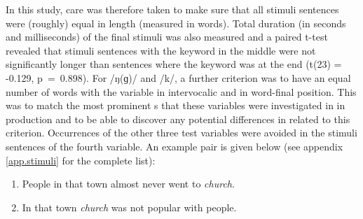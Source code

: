 In this study, care was therefore taken to make sure that all stimuli sentences were (roughly) equal in length (measured in words).
Total duration (in seconds and milliseconds) of the final stimuli was also measured and a paired t-test revealed that stimuli sentences with the keyword in the middle were not significantly longer than sentences where the keyword was at the end (t(23) = -0.129, p~=~0.898).
For /ŋ(ɡ)/ and /k/, a further criterion was to have an equal number of words with the variable in intervocalic and in word-final position.
This was to match the most prominent s that these variables were investigated in in production and to be able to discover any potential differences in  related to this criterion.
Occurrences of the other three test variables were avoided in the stimuli sentences of the fourth variable.
An example pair is given below (see appendix \ref{app.stimuli} for the complete list):

\begin{enumerate}
	\item People in that town almost never went to \emph{church}.
	\item In that town \emph{church} was not popular with people.
\end{enumerate}


